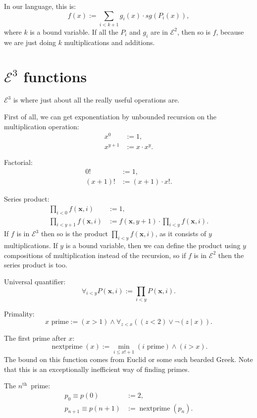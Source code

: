 \documentclass[a4paper]{article}
\newcommand{\grz}[1]{$\mathcal{E}^{#1}$}	%
\newcommand{\nth}{$n^{\textrm{th}}$~}	%
\newcommand{\xvec}{\mathbf{x}}	%
\newcommand{\recur}[1]{\begin{equation} \begin{split} #1 \end{split} \end{equation}}	%
\theoremstyle{plain}
\theoremstyle{definition}
\begin{document}
In our language, this is:
\begin{equation} f(x) := \sum_{i < k+1} g_i(x) \cdot sg(P_i(x)), \end{equation}
where $k$ is a bound variable. If all the $P_i$ and $g_i$ are in \grz{2}, then so is $f$, because we are just doing $k$ multiplications and additions.

\section{\grz{3} functions}
\grz{3} is where just about all the really useful operations are.

First of all, we can get exponentiation by unbounded recursion on the multiplication operation:
\recur{
	x^0 &:= 1,				\\
	x^{y+1} &:= x \cdot x^y.
}

Factorial:
\recur{
	0! &:= 1,	\\
	(x+1)! &:= (x+1) \cdot x!.
}

Series product:
\recur{
	\prod_{i < 0} f(\xvec,i) &:= 1,	\\
	\prod_{i < y+1} f(\xvec,i) &:= f(\xvec,y+1) \cdot \prod_{i < y} f(\xvec, i).
}
If $f$ is in \grz{3} then so is the product $\prod_{i < y} f(\xvec,i)$, as it consists of $y$ multiplications. If $y$ is a bound variable, then we can define the product using $y$ compositions of multiplication instead of the recursion, so if $f$ is in \grz{2} then the series product is too.

Universal quantifier:
\begin{equation} \forall_{i < y} P(\xvec,i) := \prod_{i < y} P(\xvec,i). \end{equation}

Primality:
\begin{equation} x \textrm{ prime} :=  (x > 1) \wedge \forall_{z < x} \left( (z < 2) \vee \neg (z \mid x) \right). \end{equation}

The first prime after $x$:
\begin{equation} \operatorname{nextprime}(x) := \min_{i \leq x!+1} (i \textrm{ prime}) \wedge (i > x). \end{equation}
The bound on this function comes from Euclid or some such bearded Greek. Note that this is an exceptionally inefficient way of finding primes.

The \nth prime:
\recur{
	p_0 \equiv p(0) &:= 2,		\\
	p_{n+1} \equiv p(n+1) &:= \operatorname{nextprime} (p_n).
}
\end{document}
